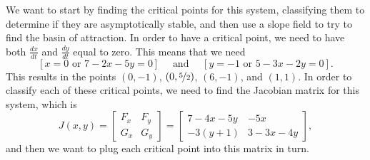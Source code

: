 \documentclass{ximera}
\begin{document}
\begin{exampleSol}
    We want to start by finding the critical points for this system, classifying them to determine if they are asymptotically stable, and then use a slope field to try to find the basin of attraction. In order to have a critical point, we need to have both $\frac{dx}{dt}$ and $\frac{dy}{dt}$ equal to zero. This means that we need
    \begin{equation*}
        \left[ x=0 \text{ or } 7-2x-5y = 0\right] \quad \text{ and } \quad \left[ y=-1 \text{ or } 5 - 3x - 2y = 0 \right]. 
    \end{equation*}
    This results in the points $(0, -1)$, $\left(0, \nicefrac{5}{2}\right)$, $(6, -1)$, and $(1, 1)$. In order to classify each of these critical points, we need to find the Jacobian matrix for this system, which is
    \begin{equation*}
        J(x,y) = \begin{bmatrix} F_x & F_y \\ G_x & G_y \end{bmatrix} = \begin{bmatrix} 7-4x-5y & -5x \\ -3(y+1) & 3 - 3x - 4y \end{bmatrix},
    \end{equation*}
    and then we want to plug each critical point into this matrix in turn. 


\end{exampleSol}
\end{document}
